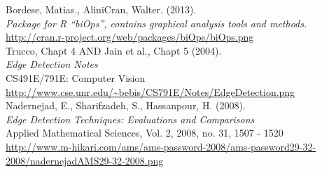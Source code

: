 \documentclass{article}%
\begin{document}
\newpage
\begin{thebibliography}{1}
 Bordese, Matias., AliniCran, Walter. (2013).\\ \textit{Package for R “biOps”, contains graphical analysis tools and methods.}\\  
\noindent\url{http://cran.r-project.org/web/packages/biOps/biOps.png}\\ 

 Trucco, Chapt 4 AND Jain et al., Chapt 5 (2004).\\ \textit{Edge Detection Notes}\\CS491E/791E: Computer Vision\\
\noindent\url{http://www.cse.unr.edu/~bebis/CS791E/Notes/EdgeDetection.png}\\

 Nadernejad, E., Sharifzadeh, S., Hassanpour, H. (2008).\\ \textit{Edge Detection Techniques: Evaluations and Comparisons}\\ Applied Mathematical Sciences, Vol. 2, 2008, no. 31, 1507 - 1520\\
\noindent\url{http://www.m-hikari.com/ams/ams-password-2008/ams-password29-32-2008/nadernejadAMS29-32-2008.png}\\
 \end{thebibliography} 
\end{document}
